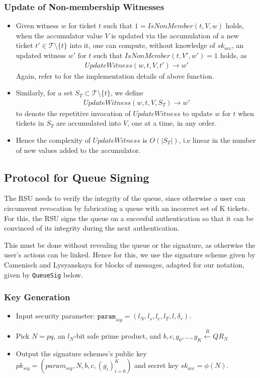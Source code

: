 \documentclass[12pt]{article}
\newcommand{\rIn}{\xleftarrow{R}}
\begin{document}
\subsubsection*{Update of Non-membership Witnesses}
\begin{itemize}
	\item Given witness $w$ for ticket $t$ such that $1 = IsNonMember(t, V, w)$ holds, when the accumulator value $V$ is updated via the accumulation of a new ticket $t' \in \mathcal{T}\setminus \{t\}$ into it, one can compute, without knowledge of $sk_{acc}$, an updated witness $w'$ for $t$ such that $IsNonMember(t, V', w') = 1$ holds, as
	\begin{align} 
		UpdateWitness(w, t, V, t') \rightarrow w' 
	\end{align}
	Again, refer to \cite*{Li} for the implementation details of above function.
	\item Similarly, for a set $S_T \subset \mathcal{T}\setminus \{t\}$, we define 
	\begin{align} 
		UpdateWitness(w, t, V, S_T) \rightarrow w' 
	\end{align}
	to denote the repetitive invocation of $UpdateWitness$
	to update $w$ for $t$ when tickets in $S_T$ are accumulated into $V$, one at a time, in any order.
	\item Hence the complexity of $UpdateWitness$ is $O(|S_T|)$, i.e linear in the number of new values added to the accumulator.
\end{itemize}


\subsection{Protocol for Queue Signing}
The RSU needs to verify the integrity of the queue, since otherwise a user can circumvent revocation by fabricating a queue with an incorrect set of K tickets. For this, the RSU signs the queue on a succesful authentication so that it can be convinced of its integrity during the next authentication. \\

\par This must be done without revealing the queue or the signature, as otherwise the user's actions can be linked. Hence for this, we use the signature scheme given by Camenisch and Lysyanskaya\cite*{CL} for blocks of messages, adapted for our notation, given by \texttt{QueueSig} below.

\subsubsection*{Key Generation}
\begin{itemize}
	\item Input security parameter: $\texttt{param}_{sig} = (l_N, l_s, l_e, l_T, l, \delta_r)$.
	\item Pick $N = pq$, an $l_N$-bit safe prime product, and $b, c, g_0, \dots, g_K \rIn QR_N$
	\item Output the signature schemes's public key $pk_{sig} = (param_{sig}, N, b, c, (g_i)_{i=0}^K)$ and secret key $sk_{acc} = \phi(N)$.
\end{itemize}
\end{document}
